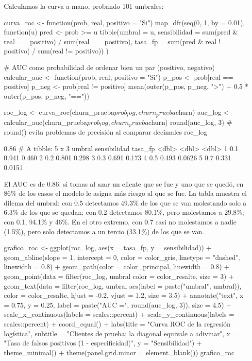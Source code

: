 Calculamos la curva a mano, probando 101 umbrales:

\begin{rcode}
curva_roc <- function(prob, real, positivo = "Si") {
  map_dfr(seq(0, 1, by = 0.01), function(u) {
    pred <- prob >= u
    tibble(umbral = u,
           sensibilidad = sum(pred & real == positivo) /
                          sum(real == positivo),
           tasa_fp = sum(pred & real != positivo) / sum(real != positivo))
  })
}

# AUC como probabilidad de ordenar bien un par (positivo, negativo)
calcular_auc <- function(prob, real, positivo = "Si") {
  p_pos <- prob[real == positivo]
  p_neg <- prob[real != positivo]
  mean(outer(p_pos, p_neg, ">") + 0.5 * outer(p_pos, p_neg, "=="))
}

roc_log <- curva_roc(churn_prueba$prob_log, churn_prueba$churn)
auc_log <- calcular_auc(churn_prueba$prob_log, churn_prueba$churn)
round(auc_log, 3)
# round() evita problemas de precisión al comparar decimales
roc_log %
\end{rcode}

\begin{rsalida}
[1] 0.86
# A tibble: 5 x 3
  umbral sensibilidad tasa_fp
   <dbl>        <dbl>   <dbl>
1    0.1        0.941  0.460 
2    0.2        0.801  0.298 
3    0.3        0.691  0.173 
4    0.5        0.493  0.0626
5    0.7        0.331  0.0151
\end{rsalida}

El AUC es de 0.86: si tomas al azar un cliente que se fue y uno que se quedó,
en 86\% de los casos el modelo le asigna más riesgo al que se fue. La tabla
muestra el dilema del umbral: con 0.5 detectamos 49.3\% de los que se van
molestando solo a 6.3\% de los que se quedan; con 0.2 detectamos 80.1\%, pero
molestamos a 29.8\%; con 0.1, 94.1\% y 46\%. En el otro extremo, con 0.7 casi no molestamos a nadie (1.5\%), pero solo
detectamos a un tercio (33.1\%) de los que se van.

\begin{rcode}
grafico_roc <- ggplot(roc_log, aes(x = tasa_fp, y = sensibilidad)) +
  geom_abline(slope = 1, intercept = 0, color = color_gris,
              linetype = "dashed", linewidth = 0.8) +
  geom_path(color = color_principal, linewidth = 0.8) +
  geom_point(data = filter(roc_log, umbral %
             color = color_resalte, size = 3) +
  geom_text(data = filter(roc_log, umbral %
            aes(label = paste("umbral", umbral)), color = color_resalte,
            hjust = -0.2, vjust = 1.2, size = 3.5) +
  annotate("text", x = 0.75, y = 0.25,
           label = paste("AUC =", round(auc_log, 3)), size = 4.5) +
  scale_x_continuous(labels = scales::percent) +
  scale_y_continuous(labels = scales::percent) +
  coord_equal() +
  labs(title = "Curva ROC de la regresión logística",
       subtitle = "Clientes de prueba; la diagonal equivale a adivinar",
       x = "Tasa de falsos positivos (1 - especificidad)",
       y = "Sensibilidad") +
  theme_minimal() +
  theme(panel.grid.minor = element_blank())
grafico_roc
\end{rcode}

